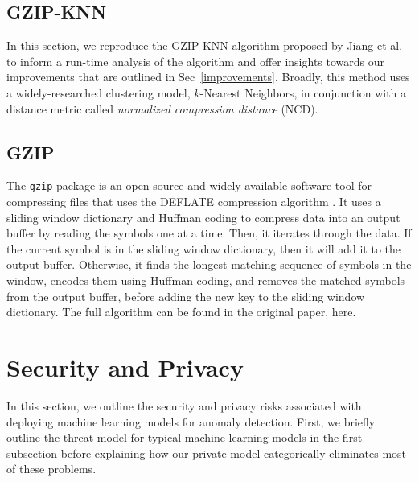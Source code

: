 \documentclass[conference]{IEEEtran}
\begin{document}
\subsection{GZIP-KNN}
In this section, we reproduce the GZIP-KNN algorithm proposed by Jiang et al. to inform a run-time analysis of the algorithm and offer insights towards our  improvements that are outlined in Sec~\ref{improvements}. Broadly, this method uses a widely-researched clustering model, $k$-Nearest Neighbors, in conjunction with a  distance metric called \textit{normalized compression distance} (NCD). 


\subsection{GZIP}
    The \texttt{gzip} package is an open-source and widely available software tool for compressing files \cite{gzip} that uses the DEFLATE compression algorithm \cite{deflate}. It uses a sliding window dictionary and Huffman coding \cite{} to compress data into an output buffer by reading the symbols one at a time. Then, it iterates through the data. If the current symbol is in the sliding window dictionary, then it will add it to the output buffer. Otherwise, it finds the longest matching sequence of symbols in the window, encodes them using Huffman coding, and removes the matched symbols from the output buffer, before adding the new key to the sliding window dictionary. The full algorithm can be found in the original paper, here\cite{deflate}. 


\section{Security and Privacy}
\label{security}
In this section, we outline the security and privacy risks associated with deploying machine learning models for anomaly detection. First, we briefly outline the threat model for typical machine learning models in the first subsection before explaining how our private model categorically eliminates most of these problems. 
\end{document}
